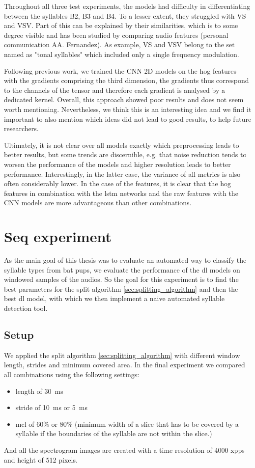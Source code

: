 Throughout all three test experiments, the models had difficulty in differentiating between the syllables B2, B3 and B4. To a lesser extent, they struggled with VS and VSV. Part of this can be explained by their similarities, which is to some degree visible and has been studied by comparing audio features (personal communication AA. Fernandez).
As example, VS and VSV belong to the set named as "tonal syllables" which included only a single frequency modulation.

Following previous work, we trained the CNN 2D models on the \gls{hog} features with the gradients comprising the third dimension, the gradients thus correspond to the channels of the tensor and therefore each gradient is analysed by a dedicated kernel.
Overall, this approach showed poor results and does not seem worth mentioning. Nevertheless, we think this is an interesting idea and we find it important to also mention which ideas did not lead to good results, to help future researchers.

Ultimately, it is not clear over all models exactly which preprocessing leads to better results, but some trends are discernible, e.g. that noise reduction tends to worsen the performance of the models and higher resolution leads to better performance. Interestingly, in the latter case, the variance of all metrics is also often considerably lower.
In the case of the features, it is clear that the \gls{hog} features in combination with the \gls{lstm} networks and the raw features with the CNN models are more advantageous than other combinations.

\section{Seq experiment}
As the main goal of this thesis was to evaluate an automated way to classify the syllable types from bat pups, we evaluate the performance of the \gls{dl} models on windowed samples of the audios. So the goal for this experiment is to find the best parameters for the split algorithm \ref{sec:splitting_algorithm} and then the best \gls{dl} model, with which we then implement a naive automated syllable detection tool.

\subsection{Setup}
We applied the split algorithm \ref{sec:splitting_algorithm} with different window length, strides and minimum covered area. In the final experiment we compared all combinations using the following settings:
\begin{itemize}
    \item length of \SI{30}{\milli\second}
    \item stride of \SI{10}{\milli\second} or \SI{5}{\milli\second}
    \item \gls{mcl} of 60\% or 80\% (minimum width of a slice that has to be covered by a syllable if the boundaries of the syllable are not within the slice.)
\end{itemize}
And all the spectrogram images are created with a time resolution of 4000 \gls{xpps} and height of 512 pixels.

